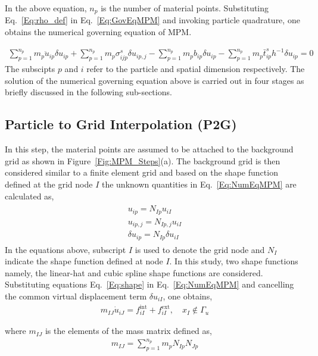 In the above equation, ${n_p}$ is the number of material points. Substituting Eq.~\ref{Eq:rho_def} in Eq.~\ref{Eq:GovEqMPM} and invoking particle quadrature, one obtains the numerical governing equation of MPM.  

\begin{align}
\sum_{p=1}^{n_p} m_p \ddot{u}_{i p} \delta u_{i p}+\sum_{p=1}^{n_p} m_p \sigma_{i j p}^s \delta u_{i p, j}-\sum_{p=1}^{n_p} m_p b_{i p} \delta u_{i p}-\sum_{p=1}^{n_p} m_p \bar{t}_{i p}^s h^{-1} \delta u_{i p}=0
\label{Eq:NumEqMPM}
\end{align}
The subscipts $p$ and $i$ refer to the particle and spatial dimension respectively. The solution of the numerical governing equation above is carried out in four stages as briefly discussed in the following sub-sections.
\subsection{Particle to Grid Interpolation (P2G)}
In this step, the material points are assumed to be attached to the background grid as shown in Figure~\ref{Fig:MPM_Steps}(a). The background grid is then considered similar to a finite element grid and based on the shape function defined at the grid node $I$ the unknown quantities in Eq.~\ref{Eq:NumEqMPM} are calculated as,
\begin{align}
\begin{array}{r}
u_{i p}  =N_{I p} u_{i I} \\
u_{i p, j}  =N_{I p, j} u_{i I}\\
\delta u_{i p} =N_{I p} \delta u_{i I}
\end{array}
\label{Eq:shape}
\end{align} 
In the equations above, subscript $I$ is used to denote the grid node and $N_I$ indicate the shape function defined at node $I$. In this study, two shape functions namely, the linear-hat and cubic spline shape functions are considered.
Substituting equations Eq.~\ref{Eq:shape} in Eq.~\ref{Eq:NumEqMPM} and cancelling the common virtual displacement term $\delta u_{i I}$, one obtains,
\begin{align}
m_{I J} \dot{u}_{i J}=f_{i I}^{\mathrm{int}}+f_{i I}^{\mathrm{ext}}, \quad x_I \notin \Gamma_u
\end{align} 

where $m_{I J}$ is the elements of the mass matrix defined as,
\begin{align}
m_{I J}=\sum_{p=1}^{n_p} m_p N_{I p} N_{J p}\\
\end{align}
 
